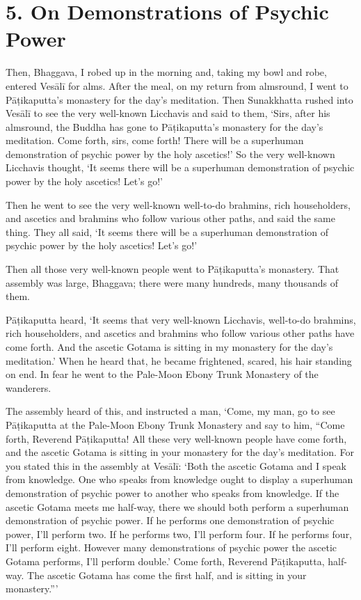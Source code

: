\documentclass[12pt,openany]{book}%
\begin{document}
\section*{5. On Demonstrations of Psychic Power }

Then, Bhaggava, I robed up in the morning and, taking my bowl and robe, entered \textsanskrit{Vesālī} for alms. After the meal, on my return from almsround, I went to \textsanskrit{Pāṭikaputta}’s monastery for the day’s meditation. Then Sunakkhatta rushed into \textsanskrit{Vesālī} to see the very well-known Licchavis and said to them, ‘Sirs, after his almsround, the Buddha has gone to \textsanskrit{Pāṭikaputta}’s monastery for the day’s meditation. Come forth, sirs, come forth! There will be a superhuman demonstration of psychic power by the holy ascetics!’ So the very well-known Licchavis thought, ‘It seems there will be a superhuman demonstration of psychic power by the holy ascetics! Let’s go!’ 

Then he went to see the very well-known well-to-do brahmins, rich householders, and ascetics and brahmins who follow various other paths, and said the same thing. They all said, ‘It seems there will be a superhuman demonstration of psychic power by the holy ascetics! Let’s go!’ 

Then all those very well-known people went to \textsanskrit{Pāṭikaputta}’s monastery. That assembly was large, Bhaggava; there were many hundreds, many thousands of them. 

\textsanskrit{Pāṭikaputta} heard, ‘It seems that very well-known Licchavis, well-to-do brahmins, rich householders, and ascetics and brahmins who follow various other paths have come forth. And the ascetic Gotama is sitting in my monastery for the day’s meditation.’ When he heard that, he became frightened, scared, his hair standing on end. In fear he went to the Pale-Moon Ebony Trunk Monastery of the wanderers. 

The assembly heard of this, and instructed a man, ‘Come, my man, go to see \textsanskrit{Pāṭikaputta} at the Pale-Moon Ebony Trunk Monastery and say to him, “Come forth, Reverend \textsanskrit{Pāṭikaputta}! All these very well-known people have come forth, and the ascetic Gotama is sitting in your monastery for the day’s meditation. For you stated this in the assembly at \textsanskrit{Vesālī}: ‘Both the ascetic Gotama and I speak from knowledge. One who speaks from knowledge ought to display a superhuman demonstration of psychic power to another who speaks from knowledge. If the ascetic Gotama meets me half-way, there we should both perform a superhuman demonstration of psychic power. If he performs one demonstration of psychic power, I’ll perform two. If he performs two, I’ll perform four. If he performs four, I’ll perform eight. However many demonstrations of psychic power the ascetic Gotama performs, I’ll perform double.’ Come forth, Reverend \textsanskrit{Pāṭikaputta}, half-way. The ascetic Gotama has come the first half, and is sitting in your monastery.”’ 
\end{document}
